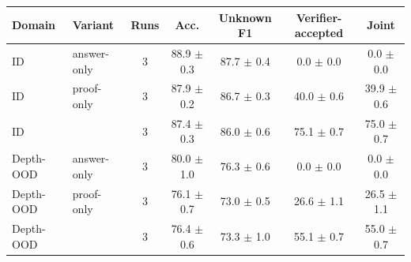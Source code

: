 \begin{tabular}{llccccc}
\toprule
Domain & Variant & Runs & Acc. & Unknown F1 & Verifier-accepted & Joint \\
\midrule
ID & answer-only & 3 & 88.9 $\pm$ 0.3 & 87.7 $\pm$ 0.4 & 0.0 $\pm$ 0.0 & 0.0 $\pm$ 0.0 \\
ID & proof-only & 3 & 87.9 $\pm$ 0.2 & 86.7 $\pm$ 0.3 & 40.0 $\pm$ 0.6 & 39.9 $\pm$ 0.6 \\
ID & \model{} & 3 & 87.4 $\pm$ 0.3 & 86.0 $\pm$ 0.6 & 75.1 $\pm$ 0.7 & 75.0 $\pm$ 0.7 \\
\midrule
Depth-OOD & answer-only & 3 & 80.0 $\pm$ 1.0 & 76.3 $\pm$ 0.6 & 0.0 $\pm$ 0.0 & 0.0 $\pm$ 0.0 \\
Depth-OOD & proof-only & 3 & 76.1 $\pm$ 0.7 & 73.0 $\pm$ 0.5 & 26.6 $\pm$ 1.1 & 26.5 $\pm$ 1.1 \\
Depth-OOD & \model{} & 3 & 76.4 $\pm$ 0.6 & 73.3 $\pm$ 1.0 & 55.1 $\pm$ 0.7 & 55.0 $\pm$ 0.7 \\
\bottomrule
\end{tabular}